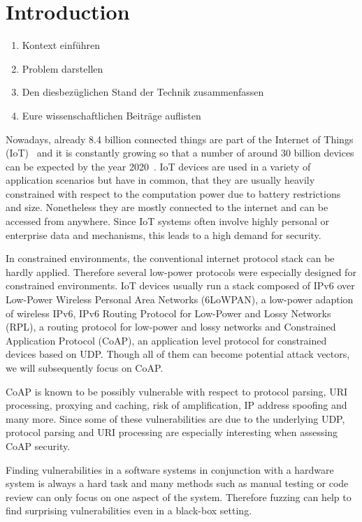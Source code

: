 \section{Introduction}
\label{section:introduction}

\begin{enumerate}
	\item Kontext einführen
	\item Problem darstellen
	\item Den diesbezüglichen Stand der Technik zusammenfassen
	\item Eure wissenschaftlichen Beiträge auflisten
\end{enumerate}

Nowadays, already 8.4 billion connected things are part of the Internet of Things (IoT)~\cite{IoTForecastGartner} and it is constantly growing so that a number of around 30 billion devices can be expected by the year 2020~\cite{IoTForecastNordrum}. IoT devices are used in a variety of application scenarios but have in common, that they are usually heavily constrained with respect to the computation power due to battery restrictions and size. Nonetheless they are mostly connected to the internet and can be accessed from anywhere. Since IoT systems often involve highly personal or enterprise data and mechanisms, this leads to a high demand for security. 

In constrained environments, the conventional internet protocol stack can be hardly applied. Therefore several low-power protocols were especially designed for constrained environments. IoT devices usually run a stack composed of IPv6 over Low-Power Wireless Personal Area Networks (6LoWPAN), a low-power adaption of wireless IPv6, IPv6 Routing Protocol for Low-Power and Lossy Networks (RPL), a routing protocol for low-power and lossy networks and Constrained Application Protocol (CoAP), an application level protocol for constrained devices based on UDP. Though all of them can become potential attack vectors, we will subsequently focus on CoAP.

CoAP is known to be possibly vulnerable with respect to protocol parsing, URI processing, proxying and caching, risk of amplification, IP address spoofing and many more. Since some of these vulnerabilities are due to the underlying UDP, protocol parsing and URI processing are especially interesting when assessing CoAP security.

Finding vulnerabilities in a software systems in conjunction with a hardware system is always a hard task and many methods such as manual testing or code review can only focus on one aspect of the system. Therefore fuzzing can help to find surprising vulnerabilities even in a black-box setting.

